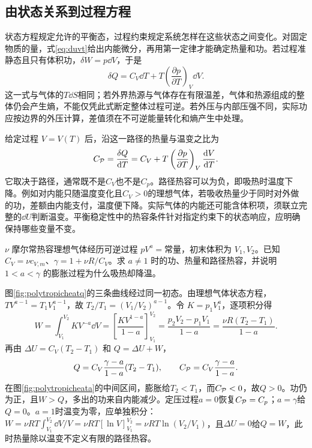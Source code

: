 \subsection{由状态关系到过程方程}
\label{th:processclosure}
状态方程规定允许的平衡态，过程约束规定系统怎样在这些状态之间变化。对固定物质的量，式\eqref{eq:duvt}给出内能微分，再用第一定律才能确定热量和功。若过程准静态且只有体积功，$\delta W=p\dd V$，于是
\[
 \delta Q=C_V\dd T+
 T\left(\frac{\partial p}{\partial T}\right)_V\dd V.
\]
这一式与气体的$T\dd S$相同；若外界热源与气体存在有限温差，气体和热源组成的整体仍会产生熵，不能仅凭此式断定整体过程可逆。若外压与内部压强不同，实际功应按边界的外压计算，差值须在不可逆能量转化和熵产生中处理。

给定过程 $V=V(T)$ 后，沿这一路径的热量与温变之比为
\[
 C_{\cal P}=\frac{\delta Q}{\mathop{}\!\mathrm d T}
 =C_V+T\left(\frac{\partial p}{\partial T}\right)_V
 \frac{\mathop{}\!\mathrm d V}{\mathop{}\!\mathrm d T}.
\]
它取决于路径，通常既不是$C_V$也不是$C_p$。路径热容可以为负，即吸热时温度下降。例如对内能只随温度变化且$C_V>0$的理想气体，若吸收热量少于同时对外做的功，差额由内能支付，温度便下降。实际气体的内能还可能含体积项，须联立完整的$\dd U$判断温变。平衡稳定性中的热容条件针对指定约束下的状态响应，应明确保持哪些变量不变。

\begin{example}
\label{ex:polytropicheat}
$\nu$ 摩尔常热容理想气体经历可逆过程 $pV^a=\text{常量}$，初末体积为 $V_1,V_2$。已知 $C_V=\nu c_{V,m}$、$\gamma=1+\nu R/C_V$。求 $a\ne1$ 时的功、热量和路径热容，并说明 $1<a<\gamma$ 的膨胀过程为什么吸热却降温。
\end{example}
\begin{solution}
图\ref{fig:polytropicheatq}的三条曲线经过同一初态。由理想气体状态方程，
$TV^{a-1}=T_1V_1^{a-1}$，故
$T_2/T_1=(V_1/V_2)^{a-1}$。令 $K=p_1V_1^a$，逐项积分得
\[
 W=\int_{V_1}^{V_2}KV^{-a}\dd V
 =\left[\frac{KV^{1-a}}{1-a}\right]_{V_1}^{V_2}
 =\frac{p_2V_2-p_1V_1}{1-a}
 =\frac{\nu R(T_2-T_1)}{1-a}.
\]
再由 $\Delta U=C_V(T_2-T_1)$ 和 $Q=\Delta U+W$，
\[
 Q=C_V\frac{\gamma-a}{1-a}(T_2-T_1),
 \qquad C_{\cal P}=C_V\frac{\gamma-a}{1-a}.
\]
在图\ref{fig:polytropicheata}的中间区间，膨胀给$T_2<T_1$，而$C_{\cal P}<0$，故$Q>0$。功仍为正，且$W>Q$，多出的功来自内能减少。定压过程$a=0$恢复$C_{\cal P}=C_p$；$a=\gamma$给$Q=0$。$a=1$时温变为零，应单独积分：$W=\nu RT\int_{V_1}^{V_2}\dd V/V=\nu RT[\ln V]_{V_1}^{V_2}=\nu RT\ln(V_2/V_1)$，且$\Delta U=0$给$Q=W$，此时热量除以温变不定义有限的路径热容。
\end{solution}

